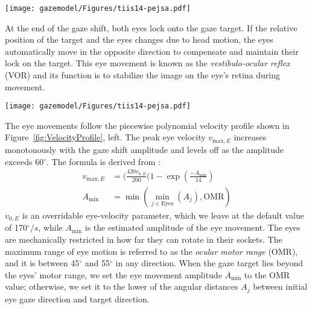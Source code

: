 \begin{figure*}
\centering
\texttt{[image: gazemodel/Figures/tiis14-pejsa.pdf]}
\caption{Phases of an eye saccade. Dashed arrows indicate eye gaze directions, while the curved arrow indicates the direction of the rotational movement. Saccade proceeds as follows: (A) Eyes begin to rotate toward the target. (B) First eye has reached the target. (C) Both eyes have reached the target.}
\label{fig:Saccades}
\end{figure*}

At the end of the gaze shift, both eyes lock onto the gaze target. If the relative position of the target and the eyes changes due to head motion, the eyes automatically move in the opposite direction to compensate and maintain their lock on the target. This eye movement is known as the \emph{vestibulo-ocular reflex} (VOR) and its function is to stabilize the image on the eye's retina during movement.

\begin{figure*}
\centering
\texttt{[image: gazemodel/Figures/tiis14-pejsa.pdf]}
\caption{Velocity profiles for the motion of different body parts. Left: Eye velocity. Right: Head and torso velocities. Mathematical expressions for the profiles are given in equations~\ref{eq:EyeVelocity} and~\ref{eq:HeadTorsoVelocity}.}
\label{fig:VelocityProfile}
\end{figure*}

The eye movements follow the piecewise polynomial velocity profile shown in Figure~\ref{fig:VelocityProfile}, left. The peak eye velocity $v_{\mathrm{max},E}$ increases monotonously with the gaze shift amplitude and levels off as the amplitude exceeds 60$^{\circ}$. The formula is derived from \citet{baloh1975quantitative}:
%
\begin{align} \label{eq:AndristVmaxE}
v_{\mathrm{max},E} &= (\frac{420 v_{0,E}}{200} (1 - \mathop{exp}(\frac{-A_{\mathrm{min}}}{14}) \\
A_{\mathrm{min}} &= \mathop{min}( \mathop{min}_{j \in \mathrm{Eyes}}(A_j), \mathrm{OMR} ) \nonumber
\end{align}
%
$v_{0,E}$ is an overridable eye-velocity parameter, which we leave at the default value of 170$^{\circ}/s$, while $A_{\mathrm{min}}$ is the estimated amplitude of the eye movement. The eyes are mechanically restricted in how far they can rotate in their sockets. The maximum range of eye motion is referred to as the \emph{ocular motor range} (OMR), and it is between 45$^{\circ}$ and 55$^{\circ}$ in any direction. When the gaze target lies beyond the eyes' motor range, we set the eye movement amplitude $A_{\mathrm{min}}$ to the OMR value; otherwise, we set it to the lower of the angular distances $A_j$ between initial eye gaze direction and target direction.

